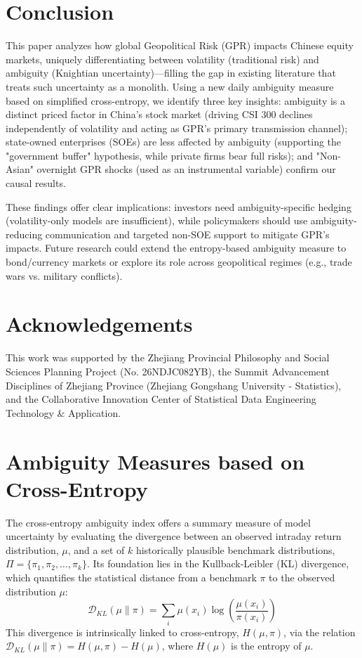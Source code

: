 \documentclass[preprint,12pt,authoryear]{elsarticle}
\begin{document}
\section{Conclusion}
\label{sec:conclusion}

This paper analyzes how global Geopolitical Risk (GPR) impacts Chinese equity markets, uniquely differentiating between volatility (traditional risk) and ambiguity (Knightian uncertainty)—filling the gap in existing literature that treats such uncertainty as a monolith. Using a new daily ambiguity measure based on simplified cross-entropy, we identify three key insights: ambiguity is a distinct priced factor in China’s stock market (driving CSI 300 declines independently of volatility and acting as GPR’s primary transmission channel); state-owned enterprises (SOEs) are less affected by ambiguity (supporting the "government buffer" hypothesis, while private firms bear full risks); and "Non-Asian" overnight GPR shocks (used as an instrumental variable) confirm our causal results.

These findings offer clear implications: investors need ambiguity-specific hedging (volatility-only models are insufficient), while policymakers should use ambiguity-reducing communication and targeted non-SOE support to mitigate GPR’s impacts. Future research could extend the entropy-based ambiguity measure to bond/currency markets or explore its role across geopolitical regimes (e.g., trade wars vs. military conflicts).




\clearpage
\section*{Acknowledgements}
This work was supported by the Zhejiang Provincial Philosophy and Social Sciences Planning Project (No. 26NDJC082YB), the Summit Advancement Disciplines of Zhejiang Province (Zhejiang Gongshang University - Statistics), and the Collaborative Innovation Center of Statistical Data Engineering Technology \& Application.

\appendix

\section{Ambiguity Measures based on Cross-Entropy}
The cross-entropy ambiguity index offers a summary measure of model uncertainty by evaluating the divergence between an observed intraday return distribution, $\mu$, and a set of $k$ historically plausible benchmark distributions, $\Pi = \{\pi_1, \pi_2, \dots, \pi_k\}$. Its foundation lies in the Kullback-Leibler (KL) divergence, which quantifies the statistical distance from a benchmark $\pi$ to the observed distribution $\mu$:
\begin{equation}
    \mathcal{D}_{KL}(\mu \| \pi) = \sum_{i} \mu(x_i) \log\left(\frac{\mu(x_i)}{\pi(x_i)}\right)
\end{equation}
This divergence is intrinsically linked to cross-entropy, $H(\mu, \pi)$, via the relation $\mathcal{D}_{KL}(\mu \| \pi) = H(\mu, \pi) - H(\mu)$, where $H(\mu)$ is the entropy of $\mu$.
\end{document}
